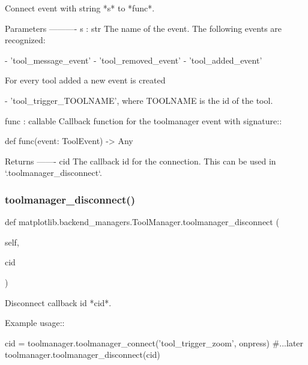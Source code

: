 \begin{DoxyVerb}Connect event with string *s* to *func*.

Parameters
----------
s : str
    The name of the event. The following events are recognized:

    - 'tool_message_event'
    - 'tool_removed_event'
    - 'tool_added_event'

    For every tool added a new event is created

    - 'tool_trigger_TOOLNAME', where TOOLNAME is the id of the tool.

func : callable
    Callback function for the toolmanager event with signature::

def func(event: ToolEvent) -> Any

Returns
-------
cid
    The callback id for the connection. This can be used in
    `.toolmanager_disconnect`.
\end{DoxyVerb}
 \mbox{\label{classmatplotlib_1_1backend__managers_1_1ToolManager_a99802a6ee6fa0ceab74d29c99f8a7019}} 
\subsubsection{\texorpdfstring{toolmanager\+\_\+disconnect()}{toolmanager\_disconnect()}}
{\footnotesize\ttfamily def matplotlib.\+backend\+\_\+managers.\+Tool\+Manager.\+toolmanager\+\_\+disconnect (\begin{DoxyParamCaption}\item[{}]{self,  }\item[{}]{cid }\end{DoxyParamCaption})}

\begin{DoxyVerb}Disconnect callback id *cid*.

Example usage::

    cid = toolmanager.toolmanager_connect('tool_trigger_zoom', onpress)
    #...later
    toolmanager.toolmanager_disconnect(cid)
\end{DoxyVerb}
 \mbox{\label{classmatplotlib_1_1backend__managers_1_1ToolManager_aed974b1d9d043a81f94565fa32e5eda2}} 
